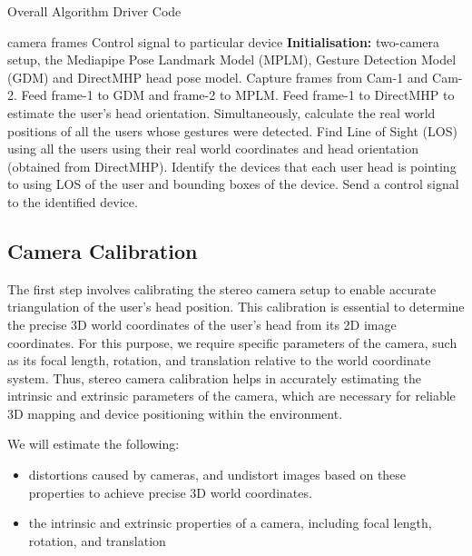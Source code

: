 \begin{algorithm}[!t]
	\caption{Overall Algorithm Driver Code}
	\begin{algorithmic}[1]
		 camera frames
		\Ensure Control signal to particular device
		\State \textbf{Initialisation:} two-camera setup, the Mediapipe Pose Landmark Model (MPLM), Gesture Detection Model (GDM) and DirectMHP head pose model.
		\State Capture frames from Cam-1 and Cam-2.
		\State Feed frame-1 to GDM and frame-2 to MPLM.
		\State Feed frame-1 to DirectMHP to estimate the user's head orientation.
		\State Simultaneously, calculate the real world positions of all the users whose gestures were detected.
		\State Find Line of Sight (LOS) using all the users using their real world coordinates and head orientation (obtained from DirectMHP).
		\State Identify the devices that each user head is pointing to using LOS of the user and bounding boxes of the device.
		\State Send a control signal to the identified device.
		\EndIf
		\EndWhile
	\end{algorithmic}
\end{algorithm}


\subsection{Camera Calibration}

The first step involves calibrating the stereo camera setup to enable accurate triangulation of the user's head position. This calibration is essential to determine the precise 3D world coordinates of the user's head from its 2D image coordinates. For this purpose, we require specific parameters of the camera, such as its focal length, rotation, and translation relative to the world coordinate system. Thus, stereo camera calibration helps in accurately estimating the intrinsic and extrinsic parameters of the camera, which are necessary for reliable 3D mapping and device positioning within the environment.

We will estimate the following:
\begin{itemize}
	\item distortions caused by cameras, and undistort images based on these properties to achieve precise 3D world coordinates.
	\item the intrinsic and extrinsic properties of a camera, including focal length, rotation, and translation
\end{itemize}

